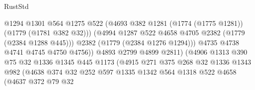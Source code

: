 \begin{lexlean}{RustStd}
\begin{coremodule}
{\begin{coremodule}
{{{{{{{{{{{                                      @1294
                                      @1301
                                      @564
                                      @1275
                                      @522
                                      (@4693
                                        @382
                                        @1281
                                        (@1774 (@1775 @1281))
                                        (@1779 (@1781 @382 @32)))
                                      (@4994
                                        @1287
                                        @522
                                        @4658
                                        @4705
                                        @2382
                                        (@1779 (@2384 @1288 @445)))
                                      @2382
                                      (@1779 (@2384 @1276 @1294)))
                                    @4735
                                    @4738
                                    @4741
                                    @4745
                                    @4750
                                    @4756))
                                @4893
                                @2799
                                @4899
                                @2811)
                              (@4906
                                @1313
                                @390
                                @75
                                @32
                                @1336
                                @1345
                                @445
                                @1173
                                (@4915
                                  @271
                                  @375
                                  @268
                                  @32
                                  @1336
                                  @1343
                                  @982
                                  (@4638
                                    @374
                                    @32
                                    @252
                                    @597
                                    @1335
                                    @1342
                                    @564
                                    @1318
                                    @522
                                    @4658
                                    (@4637
                                      @372
                                      @79
                                      @32
}}}}}}}}}}}
\end{coremodule}}
\end{coremodule}
\end{lexlean}
